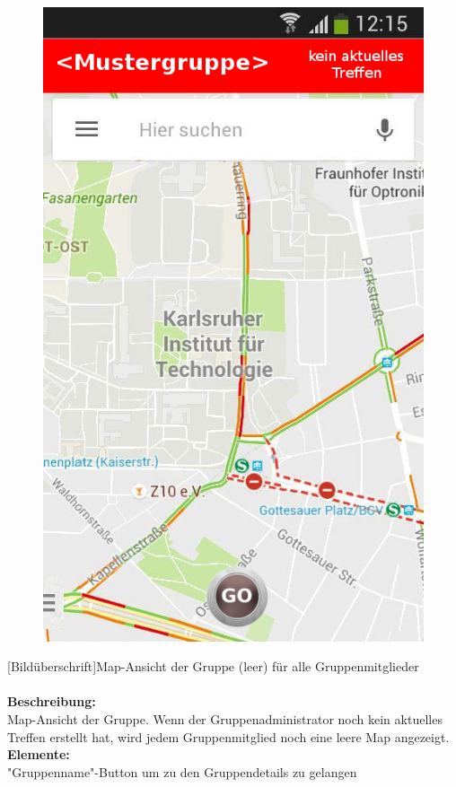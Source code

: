 \begin{figure}
	\includegraphics[scale =1]{resources/images/map_leer.png}
\end{figure}
[Bildüberschrift]Map-Ansicht der Gruppe (leer) für alle Gruppenmitglieder\\ \\
\textbf{Beschreibung:}\\
Map-Ansicht der Gruppe. Wenn der Gruppenadministrator noch kein aktuelles Treffen erstellt hat, wird jedem Gruppenmitglied noch eine leere Map angezeigt.\\
\textbf{Elemente:}\\
"Gruppenname"-Button um zu den Gruppendetails zu gelangen\\
